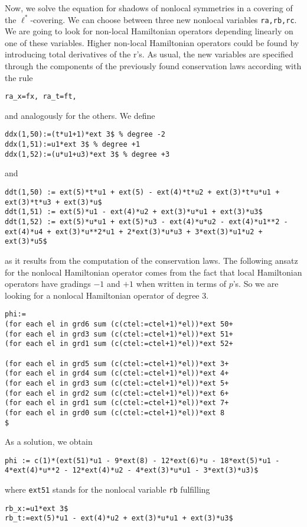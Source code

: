 \documentclass[12pt]{amsart}
\theoremstyle{definition}
\begin{document}
Now, we solve the equation for shadows of nonlocal symmetries in a covering of
the $\ell^*$-covering. We can choose between three new nonlocal variables
\texttt{ra,rb,rc}. We are going to look for non-local Hamiltonian operators
depending linearly on one of these variables. Higher non-local Hamiltonian 
operators could be found by introducing total derivatives of the r's.
As usual, the new variables are specified through the components of the 
previously found conservation laws according with the rule
\begin{verbatim}
ra_x=fx, ra_t=ft,
\end{verbatim}
and analogously for the others. We define
\begin{verbatim}
ddx(1,50):=(t*u1+1)*ext 3$ % degree -2
ddx(1,51):=u1*ext 3$ % degree +1
ddx(1,52):=(u*u1+u3)*ext 3$ % degree +3
\end{verbatim}
and
\begin{verbatim}
ddt(1,50) := ext(5)*t*u1 + ext(5) - ext(4)*t*u2 + ext(3)*t*u*u1 +
ext(3)*t*u3 + ext(3)*u$
ddt(1,51) := ext(5)*u1 - ext(4)*u2 + ext(3)*u*u1 + ext(3)*u3$
ddt(1,52) := ext(5)*u*u1 + ext(5)*u3 - ext(4)*u*u2 - ext(4)*u1**2 -
ext(4)*u4 + ext(3)*u**2*u1 + 2*ext(3)*u*u3 + 3*ext(3)*u1*u2 + ext(3)*u5$
\end{verbatim}
as it results from the computation of the conservation laws.
The following ansatz for the nonlocal Hamiltonian operator
comes from the fact that local Hamiltonian operators have 
gradings $-1$ and $+1$ when written in terms of $p$'s. So we are looking 
for a nonlocal Hamiltonian operator of degree $3$.
\begin{verbatim}
phi:=
(for each el in grd6 sum (c(ctel:=ctel+1)*el))*ext 50+
(for each el in grd3 sum (c(ctel:=ctel+1)*el))*ext 51+
(for each el in grd1 sum (c(ctel:=ctel+1)*el))*ext 52+

(for each el in grd5 sum (c(ctel:=ctel+1)*el))*ext 3+
(for each el in grd4 sum (c(ctel:=ctel+1)*el))*ext 4+
(for each el in grd3 sum (c(ctel:=ctel+1)*el))*ext 5+
(for each el in grd2 sum (c(ctel:=ctel+1)*el))*ext 6+
(for each el in grd1 sum (c(ctel:=ctel+1)*el))*ext 7+
(for each el in grd0 sum (c(ctel:=ctel+1)*el))*ext 8
$
\end{verbatim}
As a solution, we obtain
\begin{verbatim}
phi := c(1)*(ext(51)*u1 - 9*ext(8) - 12*ext(6)*u - 18*ext(5)*u1 -
4*ext(4)*u**2 - 12*ext(4)*u2 - 4*ext(3)*u*u1 - 3*ext(3)*u3)$
\end{verbatim}
where \texttt{ext51} stands for the nonlocal variable \texttt{rb} fulfilling
\begin{verbatim}
rb_x:=u1*ext 3$
rb_t:=ext(5)*u1 - ext(4)*u2 + ext(3)*u*u1 + ext(3)*u3$
\end{verbatim}
\end{document}
